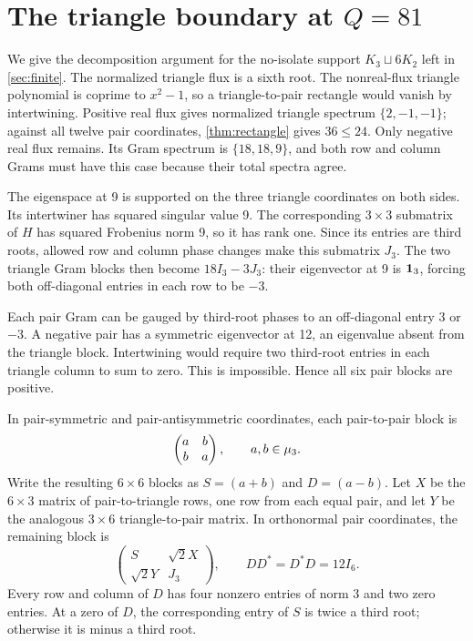 \section{The triangle boundary at \texorpdfstring{$Q=81$}{Q=81}}\label{app:q81}
We give the decomposition argument for the no-isolate support $K_3\sqcup6K_2$ left in \cref{sec:finite}. The normalized triangle flux is a sixth root. The nonreal-flux triangle polynomial is coprime to $x^2-1$, so a triangle-to-pair rectangle would vanish by intertwining. Positive real flux gives normalized triangle spectrum $\{2,-1,-1\}$; against all twelve pair coordinates, \cref{thm:rectangle} gives $36\le24$. Only negative real flux remains. Its Gram spectrum is $\{18,18,9\}$, and both row and column Grams must have this case because their total spectra agree.

The eigenspace at 9 is supported on the three triangle coordinates on both sides. Its intertwiner has squared singular value 9. The corresponding $3\times3$ submatrix of $H$ has squared Frobenius norm 9, so it has rank one. Since its entries are third roots, allowed row and column phase changes make this submatrix $J_3$. The two triangle Gram blocks then become $18I_3-3J_3$: their eigenvector at 9 is $\mathbf1_3$, forcing both off-diagonal entries in each row to be $-3$.

Each pair Gram can be gauged by third-root phases to an off-diagonal entry $3$ or $-3$. A negative pair has a symmetric eigenvector at 12, an eigenvalue absent from the triangle block. Intertwining would require two third-root entries in each triangle column to sum to zero. This is impossible. Hence all six pair blocks are positive.

In pair-symmetric and pair-antisymmetric coordinates, each pair-to-pair block is
\[
 \begin{pmatrix}a&b\\b&a\end{pmatrix},\qquad a,b\in\mu_3.
\]
Write the resulting $6\times6$ blocks as $S=(a+b)$ and $D=(a-b)$. Let $X$ be the $6\times3$ matrix of pair-to-triangle rows, one row from each equal pair, and let $Y$ be the analogous $3\times6$ triangle-to-pair matrix. In orthonormal pair coordinates, the remaining block is
\[
 \begin{pmatrix}S&\sqrt2X\\\sqrt2Y&J_3\end{pmatrix},
 \qquad DD^*=D^*D=12I_6.
\]
Every row and column of $D$ has four nonzero entries of norm 3 and two zero entries. At a zero of $D$, the corresponding entry of $S$ is twice a third root; otherwise it is minus a third root.

